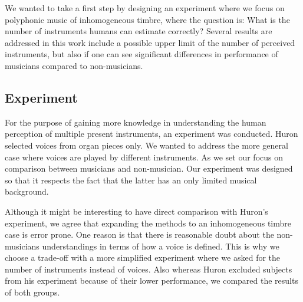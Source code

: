 We wanted to take a first step by designing an experiment where we focus on polyphonic music of inhomogeneous timbre, where the question is: What is the number of instruments humans can estimate correctly?
Several results are addressed in this work include a possible upper limit of the number of perceived instruments, but also if one can see significant differences in performance of musicians compared to non-musicians.

\subsection{Experiment}
For the purpose of gaining more knowledge in understanding the human perception of multiple present instruments, an experiment was conducted. Huron selected voices from organ pieces only. We wanted to address the more general case where voices are played by different instruments.
As we set our focus on comparison between musicians and non-musician.
Our experiment was designed so that it respects the fact that the latter has an only limited musical background.
\par
Although it might be interesting to have direct comparison with Huron's experiment, we agree that expanding the methods to an inhomogeneous timbre case is error prone. One reason is that there is reasonable doubt about the non-musicians understandings in terms of how a voice is defined. This is why we choose a trade-off with a more simplified experiment where we asked for the number of instruments instead of voices. Also whereas Huron \cite{huron89}  excluded subjects from his experiment because of their lower performance, we compared the results of both groups.

